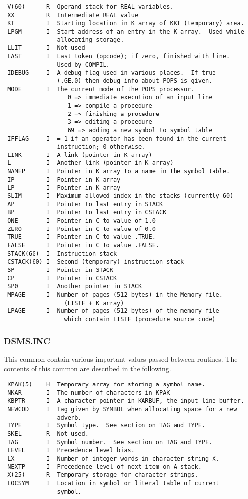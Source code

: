 \begin{verbatim}
 V(60)      R  Operand stack for REAL variables.
 XX         R  Intermediate REAL value
 KT         I  Starting location in K array of KKT (temporary) area.
 LPGM       I  Start address of an entry in the K array.  Used while
               allocating storage.
 LLIT       I  Not used
 LAST       I  Last token (opcode); if zero, finished with line.
               Used by COMPIL.
 IDEBUG     I  A debug flag used in various places.  If true
               (.GE.0) then debug info about POPS is given.
 MODE       I  The current mode of the POPS processor.
                  0 => immediate execution of an input line
                  1 => compile a procedure
                  2 => finishing a procedure
                  3 => editing a procedure
                  69 => adding a new symbol to symbol table
 IFFLAG     I  = 1 if an operator has been found in the current
               instruction; 0 otherwise.
 LINK       I  A link (pointer in K array)
 L          I  Another link (pointer in K array)
 NAMEP      I  Pointer in K array to a name in the symbol table.
 IP         I  Pointer in K array
 LP         I  Pointer in K array
 SLIM       I  Maximum allowed index in the stacks (currently 60)
 AP         I  Pointer to last entry in STACK
 BP         I  Pointer to last entry in CSTACK
 ONE        I  Pointer in C to value of 1.0
 ZERO       I  Pointer in C to value of 0.0
 TRUE       I  Pointer in C to value .TRUE.
 FALSE      I  Pointer in C to value .FALSE.
 STACK(60)  I  Instruction stack
 CSTACK(60) I  Second (temporary) instruction stack
 SP         I  Pointer in STACK
 CP         I  Pointer in CSTACK
 SP0        I  Another pointer in STACK
 MPAGE      I  Number of pages (512 bytes) in the Memory file.
                 (LISTF + K array)
 LPAGE      I  Number of pages (512 bytes) of the memory file
                 which contain LISTF (procedure source code)

\end{verbatim}
\subsubsection{DSMS.INC}
This common contain various important values passed between routines.
The contents of this common are described in the following.

\begin{verbatim}
 KPAK(5)    H  Temporary array for storing a symbol name.
 NKAR       I  The number of characters in KPAK
 KBPTR      I  A character pointer in KARBUF, the input line buffer.
 NEWCOD     I  Tag given by SYMBOL when allocating space for a new
               adverb.
 TYPE       I  Symbol type.  See section on TAG and TYPE.
 SKEL       R  Not used.
 TAG        I  Symbol number.  See section on TAG and TYPE.
 LEVEL      I  Precedence level bias.
 LX         I  Number of integer words in character string X.
 NEXTP      I  Precedence level of next item on A-stack.
 X(25)      R  Temporary storage for character strings.
 LOCSYM     I  Location in symbol or literal table of current
               symbol.

\end{verbatim}
